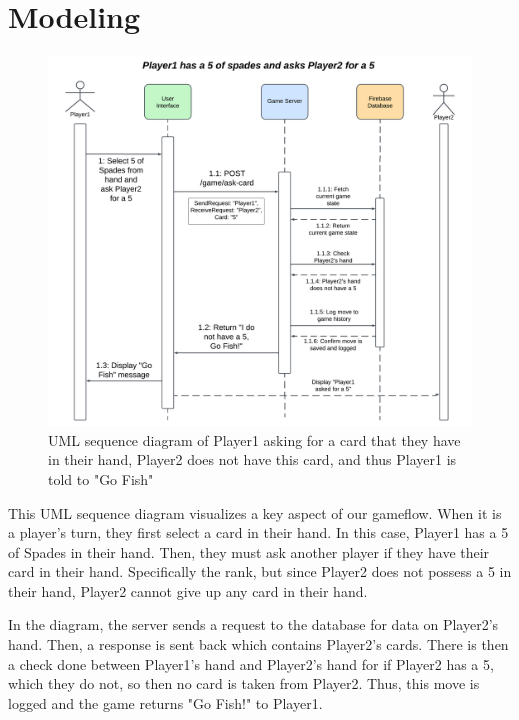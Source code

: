 \section{Modeling}

\begin{figure}[htbp]
    \centering
    \includegraphics[width=1\linewidth]{CS482 Sequence Diagram Sprint 2.png}
    \caption{UML sequence diagram of Player1 asking for a card that they have in their hand, Player2 does not have this card, and thus Player1 is told to "Go Fish"}
    \label{fig:umlsequence}
\end{figure}

This UML sequence diagram visualizes a key aspect of our gameflow. When it is a player's turn, they first select a card in their hand. In this case, Player1 has a 5 of Spades in their hand. Then, they must ask another player if they have their card in their hand. Specifically the rank, but since Player2 does not possess a 5 in their hand, Player2 cannot give up any card in their hand.

In the diagram, the server sends a request to the database for data on Player2's hand. Then, a response is sent back which contains Player2's cards. There is then a check done between Player1's hand and Player2's hand for if Player2 has a 5, which they do not, so then no card is taken from Player2. Thus, this move is logged and the game returns "Go Fish!" to Player1.